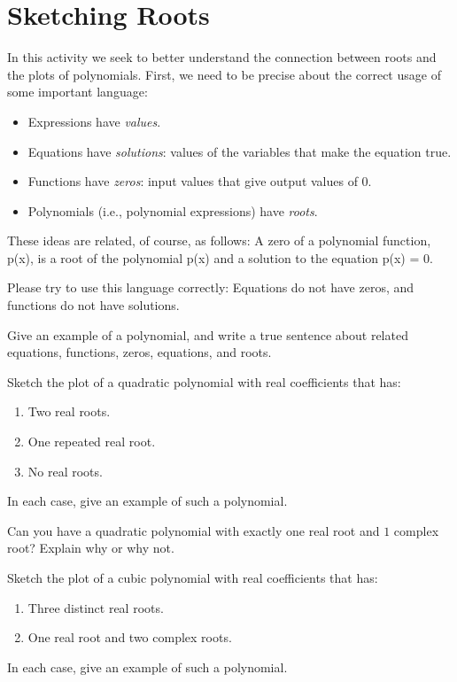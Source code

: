 \newpage
\section{Sketching Roots}\label{A:sketchRoots}

In this activity we seek to better understand the connection between
roots and the plots of polynomials.  First, we need to be precise about the correct usage of some important language:  

\begin{itemize}
\item Expressions have \emph{values}.  
\item Equations have \emph{solutions}:  values of the variables that make the equation true. 
\item Functions have \emph{zeros}: input values that give output values of 0.
\item Polynomials (i.e., polynomial expressions) have \emph{roots}.  
\end{itemize}
These ideas are related, of course, as follows:  A zero of a polynomial function, p(x), is a root of the polynomial p(x) and a solution to the equation p(x) = 0.  

Please try to use this language correctly:  Equations do not have zeros, and functions do not have solutions.  

\begin{prob}
Give an example of a polynomial, and write a true sentence about related equations, functions, zeros, equations, and roots.  
\end{prob}

\begin{prob}
Sketch the plot of a quadratic polynomial with real coefficients that has:
\begin{enumerate}
\item Two real roots.
\item One repeated real root.
\item No real roots.
\end{enumerate}
In each case, give an example of such a polynomial.
\end{prob}

\begin{prob}
Can you have a quadratic polynomial with exactly one real root and
$1$ complex root?  Explain why or why not.
\end{prob}


\begin{prob}
Sketch the plot of a cubic polynomial with real coefficients that has:
\begin{enumerate}
\item Three distinct real roots.
\item One real root and two complex roots.
\end{enumerate}
In each case, give an example of such a polynomial.
\end{prob}

